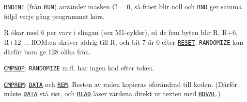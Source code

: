 \begin{Listing}
\begin{Cmt}
\par\noindent \hyperlink{l:RNDINI}{\texttt{RNDINI}} (från \texttt{RUN}) använder masken C = 0, så fröet blir noll och \texttt{RND} ger samma följd varje gång programmet körs.\par
\par\noindent R ökar med 6 per varv i slingan (sex M1-cykler), så de fem byten blir R, R+6, R+12 ... ROM:en skriver aldrig till R, och bit 7 är 0 efter \hyperlink{l:RESET}{\texttt{RESET}}. \texttt{RANDOMIZE} kan därför bara ge 128 olika frön.\par\end{Cmt}
\Gap
{}
\Gap
\begin{Cmt}\par\noindent \hyperlink{l:CMPNOP}{\texttt{CMPNOP}}: \texttt{RANDOMIZE} m.fl. har ingen kod efter token.\par\end{Cmt}
\Gap
\begin{Cmt}\par\noindent \hyperlink{l:CMPREM}{\texttt{CMPREM}}: \hyperlink{l:DATA}{\texttt{DATA}} och \hyperlink{l:REM}{\texttt{REM}}. Resten av raden kopieras oförändrad till koden. (Därför måste \hyperlink{l:DATA}{\texttt{DATA}} stå sist, och \hyperlink{l:READ}{\texttt{READ}} läser värdena direkt ur texten med \hyperlink{l:RDVAL}{\texttt{RDVAL}}.)\par\end{Cmt}

\end{Listing}
